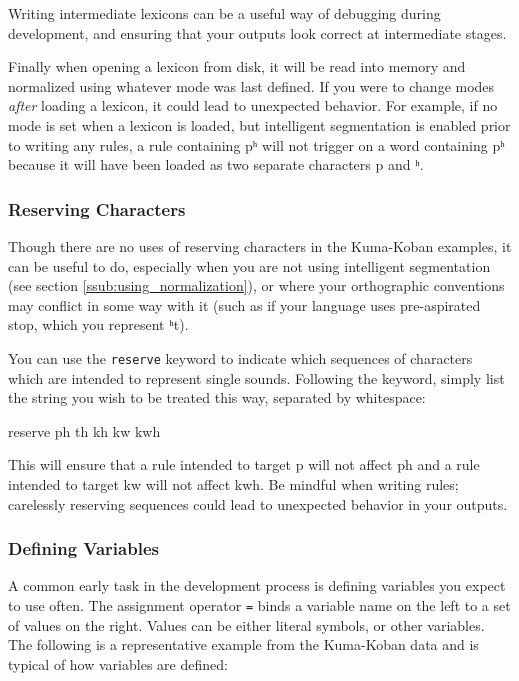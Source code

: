 \documentclass[10pt,letterpaper]{article}
\newcommand\textIPA[1]{{\fontIPA #1}}
\newcounter{excounter}
\newenvironment{vex}[1]{
  \vspace{1em}
  \refstepcounter{excounter}
  \noindent\makebox[3em][l]{(\arabic{excounter}\label{#1})}
  \minipage{\textwidth}
  \verbatim
}{
  \endverbatim
  \endminipage
  \vspace{1em}
}
\begin{document}
\noindent
Writing intermediate lexicons can be a useful way of debugging during development, and ensuring that your outputs look correct at intermediate stages.

Finally when opening a lexicon from disk, it will be read into memory and normalized using whatever mode was last defined. If you were to change modes \emph{after} loading a lexicon, it could lead to unexpected behavior. For example, if no mode is set when a lexicon is loaded, but intelligent segmentation is enabled prior to writing any rules, a rule containing \textIPA{pʰ} will not trigger on a word containing \textIPA{pʰ} because it will have been loaded as two separate characters \textIPA{p} and \textIPA{ʰ}. 


\subsubsection{Reserving Characters} 
\label{ssub:reserving_characters}
Though there are no uses of reserving characters in the Kuma-Koban examples, it can be useful to do, especially when you are not using intelligent segmentation (see section \ref{ssub:using_normalization}), or where your orthographic conventions may conflict in some way with it (such as if your language uses pre-aspirated stop, which you represent \textIPA{ʰt}).

You can use the \texttt{reserve} keyword to indicate which sequences of characters which are intended to represent single sounds. Following the keyword, simply list the string you wish to be treated this way, separated by whitespace:

\begin{vex}{ex:reserve}
reserve ph th kh kw kwh
\end{vex}

\noindent
This will ensure that a rule intended to target \textIPA{p} will not affect \textIPA{ph} and a rule intended to target \textIPA{kw} will not affect \textIPA{kwh}. Be mindful when writing rules; carelessly reserving sequences could lead to unexpected behavior in your outputs.


\subsubsection{Defining Variables}
\label{ssub:defining_variables}
A common early task in the development process is defining variables you expect to use often. The assignment operator \texttt{=} binds a variable name on the left to a set of values on the right. Values can be either literal symbols, or other variables. The following is a representative example from the Kuma-Koban data and is typical of how variables are defined:
\end{document}
